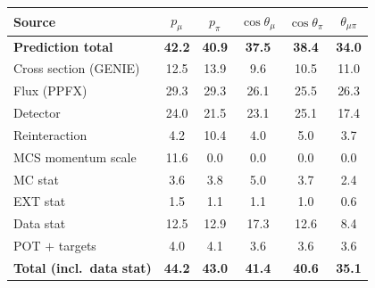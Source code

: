 \documentclass[11pt,a4paper]{article}
\begin{document}
\begin{center}\scriptsize
{}
\label{tab:systbreak_rhc}
\begin{tabular}{lccccc}
\toprule
Source & $p_\mu$ & $p_\pi$ & $\cos\theta_\mu$ & $\cos\theta_\pi$ & $\theta_{\mu\pi}$ \\
\midrule
\textbf{Prediction total} & \textbf{42.2} & \textbf{40.9} & \textbf{37.5} & \textbf{38.4} & \textbf{34.0} \\
Cross section (GENIE) & 12.5 & 13.9 & 9.6 & 10.5 & 11.0 \\
Flux (PPFX) & 29.3 & 29.3 & 26.1 & 25.5 & 26.3 \\
Detector & 24.0 & 21.5 & 23.1 & 25.1 & 17.4 \\
Reinteraction & 4.2 & 10.4 & 4.0 & 5.0 & 3.7 \\
MCS momentum scale & 11.6 & 0.0 & 0.0 & 0.0 & 0.0 \\
MC stat & 3.6 & 3.8 & 5.0 & 3.7 & 2.4 \\
EXT stat & 1.5 & 1.1 & 1.1 & 1.0 & 0.6 \\
Data stat & 12.5 & 12.9 & 17.3 & 12.6 & 8.4 \\
POT $+$ targets & 4.0 & 4.1 & 3.6 & 3.6 & 3.6 \\
\textbf{Total (incl.\ data stat)} & \textbf{44.2} & \textbf{43.0} & \textbf{41.4} & \textbf{40.6} & \textbf{35.1} \\
\bottomrule
\end{tabular}
\end{center}
\end{document}
